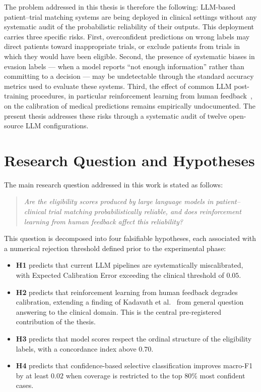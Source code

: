 The problem addressed in this thesis is therefore the following: 
LLM-based patient--trial matching systems are being deployed in 
clinical settings without any systematic audit of the probabilistic 
reliability of their outputs. This deployment carries three specific 
risks. First, overconfident predictions on wrong labels may direct 
patients toward inappropriate trials, or exclude patients from trials 
in which they would have been eligible. Second, the presence of 
systematic biases in evasion labels --- when a model reports 
``not enough information'' rather than committing to a decision --- may 
be undetectable through the standard accuracy metrics used to evaluate 
these systems. Third, the effect of common LLM post-training 
procedures, in particular reinforcement learning from human 
feedback~\cite{ouyang2022training}, on the calibration of medical 
predictions remains empirically undocumented. The present thesis 
addresses these risks through a systematic audit of twelve 
open-source LLM configurations.

\section{Research Question and Hypotheses}
\label{sec:intro-question}

The main research question addressed in this work is stated as follows:

\begin{quote}
\itshape
Are the eligibility scores produced by large language models in 
patient--clinical trial matching probabilistically reliable, and does 
reinforcement learning from human feedback affect this reliability?
\end{quote}

This question is decomposed into four falsifiable hypotheses, each 
associated with a numerical rejection threshold defined prior to the 
experimental phase:

\begin{itemize}
    \item \textbf{H1} predicts that current LLM pipelines are systematically 
    miscalibrated, with Expected Calibration Error exceeding the clinical 
    threshold of $0.05$.
    \item \textbf{H2} predicts that reinforcement learning from human 
    feedback degrades calibration, extending a finding of Kadavath et 
    al.~\cite{kadavath2022know} from general question answering to the 
    clinical domain. This is the central pre-registered contribution of 
    the thesis.
    \item \textbf{H3} predicts that model scores respect the ordinal 
    structure of the eligibility labels, with a concordance index above 
    $0.70$.
    \item \textbf{H4} predicts that confidence-based selective 
    classification improves macro-F1 by at least $0.02$ when coverage is 
    restricted to the top $80\%$ most confident cases.
\end{itemize}

